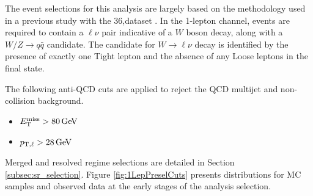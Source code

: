



The event selections for this analysis are largely based on the methodology used in a previous study with the 36,\ifb dataset \cite{Ryzhov:2310214}. In the 1-lepton channel, events are required to contain a $\ell\nu$ pair indicative of a $W$ boson decay, along with a $W/Z \to q\bar{q}$ candidate. The candidate for $W \to \ell\nu$ decay is identified by the presence of exactly one Tight lepton and the absence of any Loose leptons in the final state.

The following anti-QCD cuts are applied to reject the QCD multijet and non-collision background.
\begin{itemize}
\item $E_{\text{T}}^{\text{miss}} > 80 \,\text{Ge\kern -0.1em V}$
\item $p_{{\textrm T},\ell} > 28 \,\text{Ge\kern -0.1em V}$ %
\end{itemize}

Merged and resolved regime selections are detailed in Section \ref{subsec:sr_selection}.
Figure \ref{fig:1LepPreselCuts} presents distributions for MC samples and observed data at the early stages of the analysis selection.

